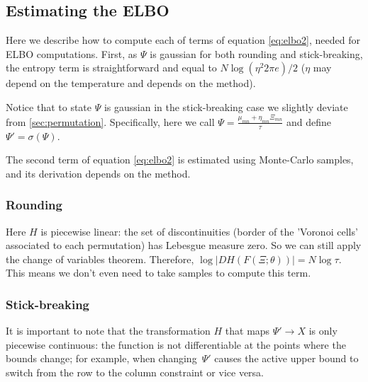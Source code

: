 \documentclass[twoside]{article}
\begin{document}
\subsection*{Estimating the ELBO} 
Here we describe how to compute each of terms of equation \eqref{eq:elbo2}, needed for ELBO computations. First, as $\Psi$ is gaussian for both rounding and stick-breaking, the entropy term is straightforward and equal to $N\log(\eta^2 2\pi e )/2$ ($\eta$ may depend on the temperature and depends on the method). 

Notice that to state $\Psi$ is gaussian in the stick-breaking case we slightly deviate from \ref{sec:permutation}. Specifically, here we call $\Psi=\frac{\mu_{mn} + \eta_{mn} \Xi_{mn}}{\tau} $ and define $\Psi' = \sigma(\Psi)$.

The second term of equation \eqref{eq:elbo2} is estimated using Monte-Carlo samples, and its derivation depends on the method. 

\subsubsection*{Rounding}
Here 
 $H$ is piecewise linear: the set of discontinuities (border of the 'Voronoi cells' associated to each permutation) has Lebesgue measure zero. So we can still apply the change of variables theorem. Therefore, 
$\log |DH(F(\Xi;\theta)) |= N\log
\tau$. This means we don't even need to take samples to compute this term.


\subsubsection*{Stick-breaking}

It is important to note that the transformation $H$ that maps $\Psi'\rightarrow X$ is only piecewise
continuous: the function is not differentiable at the points where
the bounds change; for example, when changing~$\Psi'$ causes the
active upper bound to switch from the row to the column constraint
or vice versa.  
\end{document}
